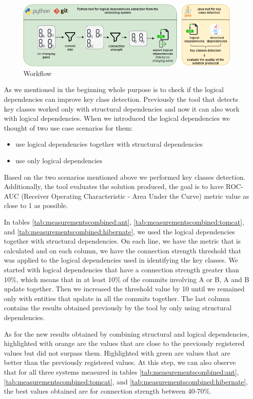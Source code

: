 \documentclass[12pt]{mitthesis}
\begin{document}
\begin{figure}[H]
\centering
\includegraphics[width=\textwidth]{key_class_workflow.png}
\caption{Workflow}
\label{fig:workflow_key}
\centering
\end{figure}


As we mentioned in the beginning whole purpose is to check if the logical dependencies can improve key class detection. Previously the tool that detects key classes worked only with structural dependencies and now it can also work with logical dependencies. When we introduced the logical dependencies we thought of two use case scenarios for them:

\begin{itemize}
	\item use logical dependencies together with structural dependencies 
	\item use only logical dependencies
\end{itemize}

Based on the two scenarios mentioned above we performed key classes detection. Additionally, the tool evaluates the solution produced, the goal is to have ROC-AUC (Receiver Operating Characteristic - Area Under the Curve) metric value as close to 1 as possible.

In tables \ref{tab:measurementscombined:ant}, \ref{tab:measurementscombined:tomcat}, and \ref{tab:measurementscombined:hibernate}, we used the logical dependencies together with structural dependencies. On each line, we have the metric that is calculated and on each column, we have the connection strength threshold that was applied to the logical dependencies used in identifying the key classes.
We started with logical dependencies that have a connection strength greater than 10\%, which means that in at least 10\% of the commits involving A or B, A and B update together. Then we increased the threshold value by 10 until we remained only with entities that update in all the commits together. The last column contains the results obtained previously by the tool by only using structural dependencies.

As for the new results obtained by combining structural and logical dependencies, highlighted with orange are the values that are close to the previously registered values but did not surpass them. Highlighted with green are values that are better than the previously registered values. At this step, we can also observe that for all three systems measured in tables \ref{tab:measurementscombined:ant}, \ref{tab:measurementscombined:tomcat}, and \ref{tab:measurementscombined:hibernate}, the best values obtained are for connection strength between 40-70\%.
\end{document}
